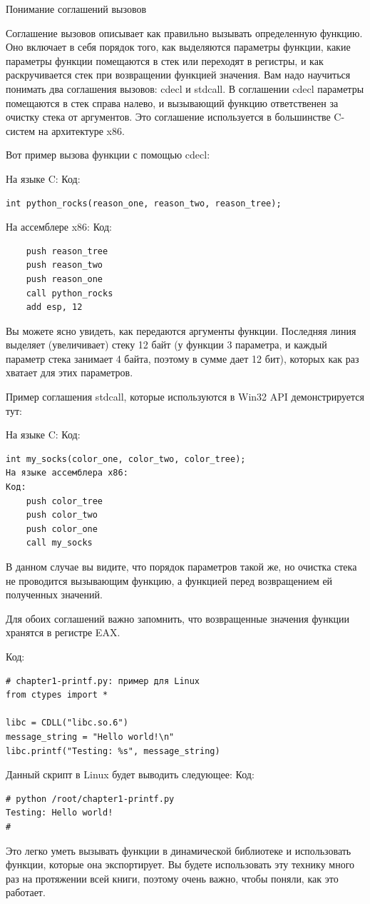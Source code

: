 \documentclass[12pt]{book}
\begin{document}
\begin{Ovalbox}{Понимание соглашений вызовов}

Соглашение вызовов описывает как правильно вызывать определенную функцию. Оно включает в себя порядок того, как выделяются параметры функции, какие параметры функции помещаются в стек или переходят в регистры, и как раскручивается стек при возвращении функцией значения. Вам надо научиться понимать два соглашения вызовов: cdecl и stdcall. В соглашении cdecl параметры помещаются в стек справа налево, и вызывающий функцию ответственен за очистку стека от аргументов. Это соглашение используется в большинстве C-систем на архитектуре x86.

Вот пример вызова функции с помощью cdecl:

На языке C:
Код:
\begin{lstlisting}
int python_rocks(reason_one, reason_two, reason_tree);
\end{lstlisting}
На ассемблере x86:
Код:
\begin{lstlisting}
    push reason_tree
    push reason_two
    push reason_one
    call python_rocks
    add esp, 12
\end{lstlisting}
Вы можете ясно увидеть, как передаются аргументы функции. Последняя линия выделяет (увеличивает) стеку 12 байт (у функции 3 параметра, и каждый параметр стека занимает 4 байта, поэтому в сумме дает 12 бит), которых как раз хватает для этих параметров.

Пример соглашения stdcall, которые используются в Win32 API демонстрируется тут:

На языке C:
Код:
\begin{lstlisting}
int my_socks(color_one, color_two, color_tree);
На языке ассемблера x86:
Код:
    push color_tree
    push color_two
    push color_one
    call my_socks
\end{lstlisting}
В данном случае вы видите, что порядок параметров такой же, но очистка стека не проводится вызывающим функцию, а функцией перед возвращением ей полученных значений.

Для обоих соглашений важно запомнить, что возвращенные значения функции хранятся в регистре EAX.
\end{Ovalbox}
Код:
\begin{lstlisting}
# chapter1-printf.py: пример для Linux
from ctypes import *

libc = CDLL("libc.so.6")
message_string = "Hello world!\n"
libc.printf("Testing: %s", message_string)
\end{lstlisting}
Данный скрипт в Linux будет выводить следующее:
Код:
\begin{lstlisting}
# python /root/chapter1-printf.py
Testing: Hello world!
#
\end{lstlisting}
Это легко уметь вызывать функции в динамической библиотеке и использовать функции, которые она экспортирует. Вы будете использовать эту технику много раз на протяжении всей книги, поэтому очень важно, чтобы поняли, как это работает.
\end{document}
